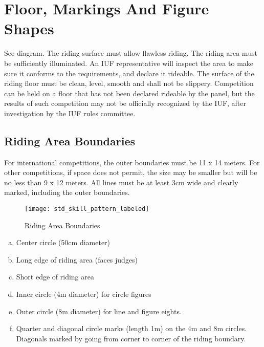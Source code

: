 \section{Floor, Markings And Figure Shapes}
See diagram.
The riding surface must allow flawless riding.
The riding area must be sufficiently illuminated.
An IUF representative will inspect the area to make sure it conforms to the requirements, and declare it rideable.
The surface of the riding floor must be clean, level, smooth and shall not be slippery.
Competition can be held on a floor that has not been declared rideable by the panel, but the results of such competition may not be officially recognized by the IUF, after investigation by the IUF rules committee.

\subsection{Riding Area Boundaries \label{subsec:freestyle_floor-markings-figure-shapes_riding-area-boundaries}}
For international competitions, the outer boundaries must be 11 x 14 meters.
For other competitions, if space does not permit, the size may be smaller but will be no less than 9 x 12 meters.
All lines must be at least 3cm wide and clearly marked, including the outer boundaries.

\begin{figure}[h]
\begin{center}
\texttt{[image: std\_skill\_pattern\_labeled]}
\end{center}
\vspace{-20pt}
\caption{Riding Area Boundaries \label{fig:std_skill_pattern_labeled}}
\vspace{-10pt}
\end{figure}

\begin{enumerate}[a.]
\item Center circle (50cm diameter)
\item Long edge of riding area (faces judges)
\item Short edge of riding area
\item Inner circle (4m diameter) for circle figures
\item Outer circle (8m diameter) for line and figure eights.
\item Quarter and diagonal circle marks (length 1m) on the 4m and 8m circles.
Diagonals marked by going from corner to corner of the riding boundary.
\end{enumerate}


